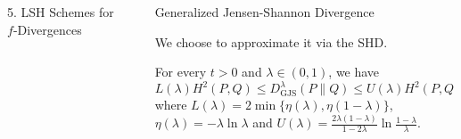 \documentclass[final]{beamer}
\newcommand{\wjs}[3]{D_{\mathrm{GJS}}^{#1}( #2 \parallel #3 )}
\newlength{\sepwid}
\newlength{\onecolwid}
\newlength{\threecolwid}
\begin{document}
\begin{frame}[t]
\begin{columns}[t]
\begin{column}{\onecolwid}
\begin{block}{5. LSH Schemes for $ f $-Divergences}
	
\end{block}

\end{column} %
 		\begin{column}{\sepwid}\end{column} %
\begin{column}{\threecolwid} %
	\vspace{-40pt}
	
	\begin{block}{Generalized Jensen-Shannon 
			Divergence}
		
		
		We choose to approximate it via the SHD.

		For every  $ 
		t>0 $ 
		and $ \lambda\in (0,1) $, we have
		\begin{equation*}
		L(\lambda)H^2(P, Q)\le 	\wjs{\lambda}{P}{Q}
		\le  U(\lambda)H^2(P, Q)\le 
		H^2(P, 
		Q) ,
		\end{equation*}
		where $ L(\lambda) = 2 \min\{ \eta(\lambda), 
		\eta(1-\lambda) \} $, $ \eta(\lambda) = -\lambda \ln \lambda $ and 
		$ 
		U(\lambda) = 
		\frac{2\lambda(1-\lambda)}{1-2\lambda}\ln \frac{1-\lambda}{\lambda} 
		$.
		

\end{block}
\end{column}
\end{columns}
\end{frame}
\end{document}
